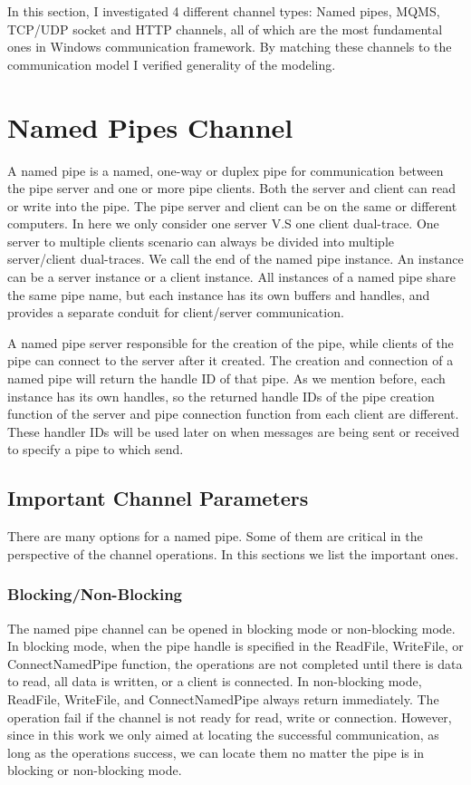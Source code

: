 \label{chapter:Mod}
In this section, I investigated 4 different channel types: Named pipes, MQMS, TCP/UDP socket and HTTP channels, all of which are the most fundamental ones in Windows communication framework. By matching these channels to the communication model I verified generality of the modeling. 


\section{Named Pipes Channel}
A named pipe is a named, one-way or duplex pipe for communication between the pipe server and one or more pipe clients. Both the server and client can read or write into the pipe. The pipe server and client can be on the same or different computers.  In here we only consider one server V.S one client dual-trace. One server to multiple clients scenario can always be divided into multiple server/client dual-traces. We call the end of the named pipe instance. An instance can be a server instance or a client instance. All instances of a named pipe share the same pipe name, but each instance has its own buffers and handles, and provides a separate conduit for client/server communication. 

A named pipe server responsible for the creation of the pipe, while clients of the pipe can connect to the server after it created. The creation and connection of a named pipe will return the handle ID of that pipe. As we mention before, each instance has its own handles, so the returned handle IDs of the pipe creation function of the server and pipe connection function from each client are different. These handler IDs will be used later on when messages are being sent or received to specify a pipe to which send.

\subsection{Important Channel Parameters}
There are many options for a named pipe. Some of them are critical in the perspective of the channel operations. In this sections we list the important ones.

\subsubsection{Blocking/Non-Blocking}
The named pipe channel can be opened in blocking mode or non-blocking mode. In blocking mode, when the pipe handle is specified in the ReadFile, WriteFile, or ConnectNamedPipe function, the operations are not completed until there is data to read, all data is written, or a client is connected. In non-blocking mode, ReadFile, WriteFile, and ConnectNamedPipe always return immediately. The operation fail if the channel is not ready for read, write or connection. However, since in this work we only aimed at locating the successful communication, as long as the operations success, we can locate them no matter the pipe is in blocking or non-blocking mode.

